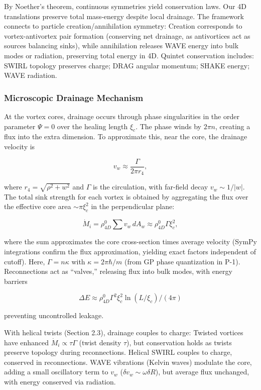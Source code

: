 By Noether's theorem, continuous symmetries yield conservation laws. Our 4D translations preserve total mass-energy despite local drainage. The framework connects to particle creation/annihilation symmetry: Creation corresponds to vortex-antivortex pair formation (conserving net drainage, as antivortices act as sources balancing sinks), while annihilation releases WAVE energy into bulk modes or radiation, preserving total energy in 4D. Quintet conservation includes: SWIRL topology preserves charge; DRAG angular momentum; SHAKE energy; WAVE radiation.

\subsubsection{Microscopic Drainage Mechanism}
At the vortex cores, drainage occurs through phase singularities in the order parameter $\Psi=0$ over the healing length $\xi_c$. The phase winds by $2\pi n$, creating a flux into the extra dimension. To approximate this, near the core, the drainage velocity is

\begin{equation}
v_w \approx \frac{\Gamma}{2\pi r_4},
\end{equation}

where $r_4 = \sqrt{\rho^2 + w^2}$ and $\Gamma$ is the circulation, with far-field decay $v_w \sim 1/|w|$. The total sink strength for each vortex is obtained by aggregating the flux over the effective core area $\sim \pi \xi_c^2$ in the perpendicular plane:

\begin{equation}
\dot{M}_i = \rho_{4D}^0 \sum v_w \, dA_w \approx \rho_{4D}^0 \Gamma \xi_c^2,
\end{equation}

where the sum approximates the core cross-section times average velocity (SymPy integrations confirm the flux approximation, yielding exact factors independent of cutoff). Here, $\Gamma = n \kappa$ with $\kappa = 2 \pi \hbar / m$ (from GP phase quantization in P-1). Reconnections act as ``valves,'' releasing flux into bulk modes, with energy barriers

\begin{equation}
\Delta E \approx \rho_{4D}^0 \Gamma^2 \xi_c^2 \ln(L / \xi_c) / (4\pi)
\end{equation}

preventing uncontrolled leakage.

With helical twists (Section 2.3), drainage couples to charge: Twisted vortices have enhanced $\dot{M}_i \propto \tau \Gamma$ (twist density $\tau$), but conservation holds as twists preserve topology during reconnections. Helical SWIRL couples to charge, conserved in reconnections. WAVE vibrations (Kelvin waves) modulate the core, adding a small oscillatory term to $v_w$ ($\delta v_w \sim \omega \delta R$), but average flux unchanged, with energy conserved via radiation.

